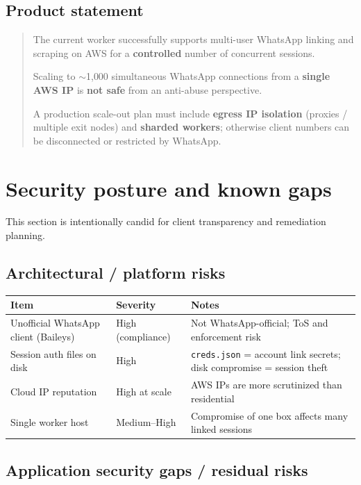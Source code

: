 \documentclass[11pt,a4paper]{article}
\begin{document}
\subsection{Product statement}

\begin{quote}
The current worker successfully supports multi-user WhatsApp linking and scraping on AWS for a \textbf{controlled} number of concurrent sessions.

Scaling to $\sim$1{,}000 simultaneous WhatsApp connections from a \textbf{single AWS IP} is \textbf{not safe} from an anti-abuse perspective.

A production scale-out plan must include \textbf{egress IP isolation} (proxies / multiple exit nodes) and \textbf{sharded workers}; otherwise client numbers can be disconnected or restricted by WhatsApp.
\end{quote}

\section{Security posture and known gaps}

This section is intentionally candid for client transparency and remediation planning.

\subsection{Architectural / platform risks}

\begin{tabularx}{\textwidth}{L{4.4cm} L{3.2cm} X}
\toprule
\textbf{Item} & \textbf{Severity} & \textbf{Notes} \\
\midrule
Unofficial WhatsApp client (Baileys) & High (compliance) & Not WhatsApp-official; ToS and enforcement risk \\
Session auth files on disk & High & \texttt{creds.json} = account link secrets; disk compromise = session theft \\
Cloud IP reputation & High at scale & AWS IPs are more scrutinized than residential \\
Single worker host & Medium--High & Compromise of one box affects many linked sessions \\
\bottomrule
\end{tabularx}

\subsection{Application security gaps / residual risks}
\end{document}
